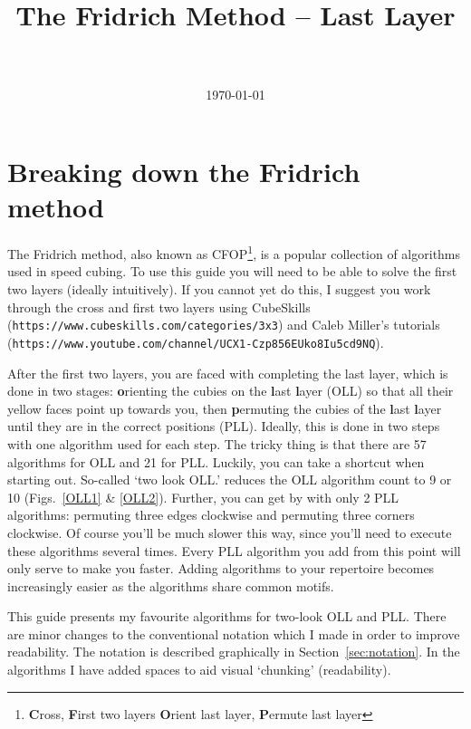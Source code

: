 \documentclass[paper=a4, fontsize=11pt, parskip=full]{scrartcl} %
\title{	
\normalfont \normalsize 
\horrule{0.5pt} \\[0.4cm] %
\huge The Fridrich Method -- Last Layer \\ %
\horrule{2pt} \\[0.5cm] %
}
\date{\normalsize\today} %
\newcommand{\2}{\ensuremath{^2}} %
\begin{document}
\maketitle %




\section{Breaking down the Fridrich method}

The Fridrich method, also known as CFOP\footnote{\textbf{C}ross, \textbf{F}irst two layers
\textbf{O}rient last layer, \textbf{P}ermute last layer}, is a popular collection of algorithms used in speed cubing. 
To use this guide you will need to be able to solve the first two layers (ideally intuitively). If you cannot yet do this, I suggest you 
work through the cross and first two layers using CubeSkills (\texttt{https://www.cubeskills.com/categories/3x3}) and Caleb Miller's tutorials (\texttt{https://www.youtube.com/channel/UCX1-Czp856EUko8Iu5cd9NQ}).

After the first two layers, you are faced with completing the last layer, which is done in two stages: \textbf{o}rienting the cubies on the 
\textbf{l}ast \textbf{l}ayer (OLL) so that all their yellow faces point up towards you, then \textbf{p}ermuting the cubies of the \textbf{l}ast \textbf{l}ayer until they are in the correct positions (PLL). 
Ideally, this is done in two steps with one algorithm used for each step. 
The tricky thing is that there are 57 algorithms for OLL and 21 for PLL. 
Luckily, you can take a shortcut when starting out. 
So-called `two look OLL.' reduces the OLL algorithm count to 9 or 10 (Figs.~\ref{OLL1} \& \ref{OLL2}). 
Further, you can get by with only 2 PLL algorithms: permuting three edges clockwise and permuting three corners clockwise. 
Of course you'll be much slower this way, since you'll need to execute these algorithms several times. 
Every PLL algorithm you add from this point will only serve to make you faster. 
Adding algorithms to your repertoire becomes increasingly easier as the algorithms share common motifs. 

This guide presents my favourite algorithms for two-look OLL and PLL.
There are minor changes to the conventional notation which I made in order to improve readability. 
The notation is described graphically in Section~\ref{sec:notation}. 
In the algorithms I have added spaces to aid visual `chunking' (readability). 
\end{document}
